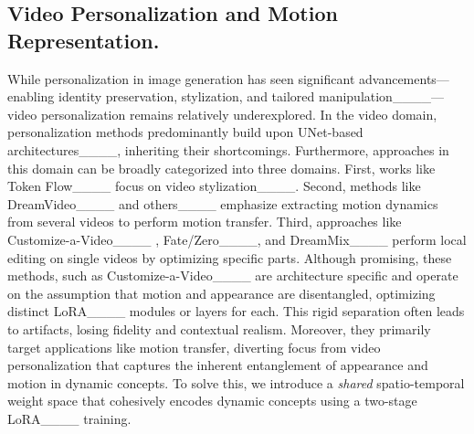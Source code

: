 \subsection{Video Personalization and Motion Representation.}
While personalization in image generation has seen significant advancements—enabling identity preservation, stylization, and tailored manipulation____---video personalization remains relatively underexplored. In the video domain, personalization methods predominantly build upon UNet-based architectures____, inheriting their shortcomings.
Furthermore, approaches in this domain can be broadly categorized into three domains.
First, works like Token Flow____ focus on video stylization____.
Second, methods like DreamVideo____ and others____ emphasize extracting motion dynamics from several videos to perform motion transfer.
Third, approaches like Customize-a-Video____ , Fate/Zero____, and DreamMix____ perform local editing on single videos by optimizing specific parts.
Although promising, these methods, such as Customize-a-Video____ are architecture specific and operate on the assumption that motion and appearance are disentangled, optimizing distinct LoRA____ modules or layers for each.
This rigid separation often leads to artifacts, losing fidelity and contextual realism.
Moreover, they primarily target applications like motion transfer, diverting focus from video personalization that captures the inherent entanglement of appearance and motion in dynamic concepts.
To solve this, we introduce a \textit{shared} spatio-temporal weight space that cohesively encodes dynamic concepts using a two-stage LoRA____ training.


